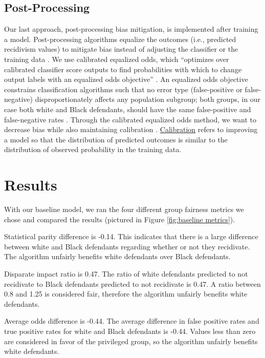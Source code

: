 \documentclass[,article,,moreauthors,pdftex]{mdpi}
\begin{document}
\hypertarget{post-processing}{%
\subsection{Post-Processing}\label{post-processing}}

Our last approach, post-processing bias mitigation, is implemented after
training a model. Post-processing algorithms equalize the outcomes
(i.e., predicted recidivism values) to mitigate bias instead of
adjusting the classifier or the training data \citep{baxter2021AI}. We
use calibrated equalized odds, which ``optimizes over calibrated
classifier score outputs to find probabilities with which to change
output labels with an equalized odds objective''
\citep{aif360-oct-2018}. An equalized odds objective constrains
classification algorithms such that no error type (false-positive or
false-negative) disproportionately affects any population subgroup; both
groups, in our case both white and Black defendants, should have the
same false-positive and false-negative rates \citep{pleiss2017fairness}.
Through the calibrated equalized odds method, we want to decrease bias
while also maintaining calibration \citep{pleiss2017fairness}.
\href{https://medium.com/analytics-vidhya/calibration-in-machine-learning-e7972ac93555}{Calibration}
refers to improving a model so that the distribution of predicted
outcomes is similar to the distribution of observed probability in the
training data.

\hypertarget{results}{%
\section{Results}\label{results}}

With our baseline model, we ran the four different group fairness
metrics we chose and compared the results (pictured in Figure
\ref{fig:baseline metrics}).

Statistical parity difference is -0.14. This indicates that there is a
large difference between white and Black defendants regarding whether or
not they recidivate. The algorithm unfairly benefits white defendants
over Black defendants.

Disparate impact ratio is 0.47. The ratio of white defendants predicted
to not recidivate to Black defendants predicted to not recidivate is
0.47. A ratio between 0.8 and 1.25 is considered fair, therefore the
algorithm unfairly benefits white defendants.

Average odds difference is -0.44. The average difference in false
positive rates and true positive rates for white and Black defendants is
-0.44. Values less than zero are considered in favor of the privileged
group, so the algorithm unfairly benefits white defendants.
\end{document}
